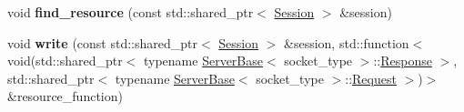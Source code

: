 \begin{DoxyCompactItemize}
\item 
void {\bfseries find\+\_\+resource} (const std\+::shared\+\_\+ptr$<$ \hyperlink{classSimpleWeb_1_1ServerBase_1_1Session}{Session} $>$ \&session)\hypertarget{classSimpleWeb_1_1ServerBase_a502677b3bfac7ca06f476134213181c7}{}\label{classSimpleWeb_1_1ServerBase_a502677b3bfac7ca06f476134213181c7}

\item 
void {\bfseries write} (const std\+::shared\+\_\+ptr$<$ \hyperlink{classSimpleWeb_1_1ServerBase_1_1Session}{Session} $>$ \&session, std\+::function$<$ void(std\+::shared\+\_\+ptr$<$ typename \hyperlink{classSimpleWeb_1_1ServerBase}{Server\+Base}$<$ socket\+\_\+type $>$\+::\hyperlink{classSimpleWeb_1_1ServerBase_1_1Response}{Response} $>$, std\+::shared\+\_\+ptr$<$ typename \hyperlink{classSimpleWeb_1_1ServerBase}{Server\+Base}$<$ socket\+\_\+type $>$\+::\hyperlink{classSimpleWeb_1_1ServerBase_1_1Request}{Request} $>$)$>$ \&resource\+\_\+function)\hypertarget{classSimpleWeb_1_1ServerBase_a5486c77ddab988a23d594e9c5df1ae21}{}\label{classSimpleWeb_1_1ServerBase_a5486c77ddab988a23d594e9c5df1ae21}

\end{DoxyCompactItemize}
